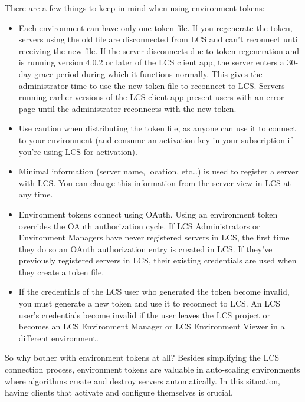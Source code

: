 \noindent\hrulefill

There are a few things to keep in mind when using environment tokens:

\begin{itemize}
\item
  Each environment can have only one token file. If you regenerate the
  token, servers using the old file are disconnected from LCS and can't
  reconnect until receiving the new file. If the server disconnects due
  to token regeneration and is running version 4.0.2 or later of the LCS
  client app, the server enters a 30-day grace period during which it
  functions normally. This gives the administrator time to use the new
  token file to reconnect to LCS. Servers running earlier versions of
  the LCS client app present users with an error page until the
  administrator reconnects with the new token.
\item
  Use caution when distributing the token file, as anyone can use it to
  connect to your environment (and consume an activation key in your
  subscription if you're using LCS for activation).
\item
  Minimal information (server name, location, etc\ldots) is used to
  register a server with LCS. You can change this information from
  \href{/docs/7-2/deploy/-/knowledge_base/d/managing-lcs-servers}{the
  server view in LCS} at any time.
\item
  Environment tokens connect using OAuth. Using an environment token
  overrides the OAuth authorization cycle. If LCS Administrators or
  Environment Managers have never registered servers in LCS, the first
  time they do so an OAuth authorization entry is created in LCS. If
  they've previously registered servers in LCS, their existing
  credentials are used when they create a token file.
\item
  If the credentials of the LCS user who generated the token become
  invalid, you must generate a new token and use it to reconnect to LCS.
  An LCS user's credentials become invalid if the user leaves the LCS
  project or becomes an LCS Environment Manager or LCS Environment
  Viewer in a different environment.
\end{itemize}

So why bother with environment tokens at all? Besides simplifying the
LCS connection process, environment tokens are valuable in auto-scaling
environments where algorithms create and destroy servers automatically.
In this situation, having clients that activate and configure themselves
is crucial.

